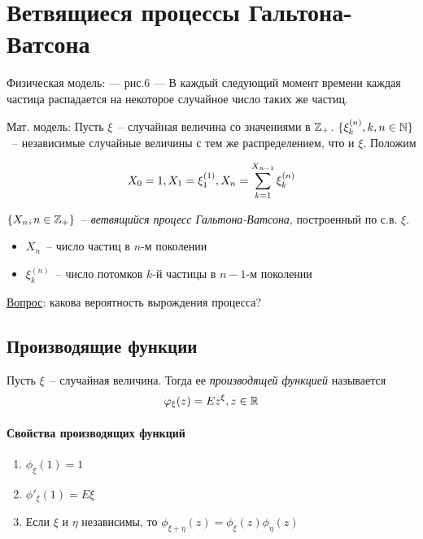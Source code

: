 

\ifdefined\Main\else

\fi

\section{Ветвящиеся процессы Гальтона-Ватсона}
Физическая модель: --- рис.6 ---
В каждый следующий момент времени каждая частица распадается на некоторое случайное число
таких же частиц.

Мат. модель:
Пусть $\xi$~-- случайная величина со значениями в $\mathbb{Z}_+$.
$\{\xi_k^{(n)}, k, n \in \mathbb{N}\}$~-- независимые случайные величины с тем
же распределением, что и $\xi$. Положим

$$X_0 = 1, X_1 = \xi_1^{(1)}, X_n = \sum\limits_{k=1}^{X_{n-1}} \xi_k^{(n)}$$

\begin{definition}
$\{X_n, n \in \mathbb{Z}_+\}$~-- \emph{ветвящийся процесс Гальтона-Ватсона}, построенный по с.в. $\xi$.
\end{definition}

\begin{itemize}
\item $X_n$~-- число частиц в $n$-м поколении
\item $\xi_k^{(n)}$~-- число потомков $k$-й частицы в $n-1$-м поколении
\end{itemize}

\underline{Вопрос}: какова вероятность вырождения процесса?

\subsection{Производящие функции}
\begin{definition}
Пусть $\xi$~-- случайная величина. Тогда ее \emph{производящей функцией} называется
$$\varphi_\xi(z) = Ez^\xi, z \in \mathbb{R}$$
\end{definition}

\paragraph{Свойства производящих функций}

\begin{enumerate}
\item $\phi_\xi(1) = 1$
\item $\phi'_\xi(1) = E\xi$
\item Если $\xi$ и $\eta$ независимы, то $\phi_{\xi + \eta}(z) = \phi_\xi(z) \phi_\eta(z)$
\end{enumerate}

